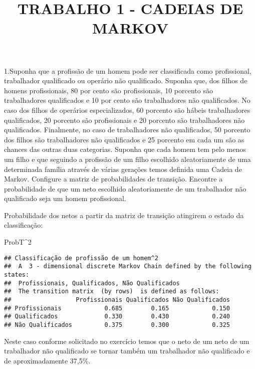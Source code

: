 \documentclass[
]{article}
\title{TRABALHO 1 - CADEIAS DE MARKOV}
\author{}
\date{\vspace{-2.5em}}
\newenvironment{Shaded}{\begin{snugshade}}{\end{snugshade}}
\newcommand{\DecValTok}[1]{\textcolor[rgb]{0.00,0.00,0.81}{#1}}
\newcommand{\NormalTok}[1]{#1}
\newcommand{\OperatorTok}[1]{\textcolor[rgb]{0.81,0.36,0.00}{\textbf{#1}}}
\begin{document}
\maketitle

1.Suponha que a profissão de um homem pode ser classificada como
profissional, trabalhador qualificado ou operário não qualificado.
Suponha que, dos filhos de homens profissionais, 80 por cento são
profissionais, 10 porcento são trabalhadores qualificados e 10 por cento
são trabalhadores não qualificados. No caso dos filhos de operários
especializados, 60 porcento são hábeis trabalhadores qualificados, 20
porcento são profissionais e 20 porcento são trabalhadores não
qualificados. Finalmente, no caso de trabalhadores não qualificados, 50
porcento dos filhos são trabalhadores não qualificados e 25 porcento em
cada um são as chances das outras duas categorias. Suponha que cada
homem tem pelo menos um filho e que seguindo a profissão de um filho
escolhido aleatoriamente de uma determinada família através de várias
gerações temos definida uma Cadeia de Markov. Configure a matriz de
probabilidades de transição. Encontre a probabilidade de que um neto
escolhido aleatoriamente de um trabalhador não qualificado seja um homem
profissional.

Probabilidade dos netos a partir da matriz de transição atingirem o
estado da classificação:

\begin{Shaded}
\begin{Highlighting}[]
\NormalTok{ProbT}\OperatorTok{^}\DecValTok{2}
\end{Highlighting}
\end{Shaded}

\begin{verbatim}
## Classificação de profissão de um homem^2 
##  A  3 - dimensional discrete Markov Chain defined by the following states: 
##  Profissionais, Qualificados, Não Qualificados 
##  The transition matrix  (by rows)  is defined as follows: 
##                  Profissionais Qualificados Não Qualificados
## Profissionais            0.685        0.165            0.150
## Qualificados             0.330        0.430            0.240
## Não Qualificados         0.375        0.300            0.325
\end{verbatim}

Neste caso conforme solicitado no exercício temos que o neto de um neto
de um trabalhador não qualificado se tornar também um trabalhador não
qualificado e de aproximadamente 37,5\%.
\end{document}
